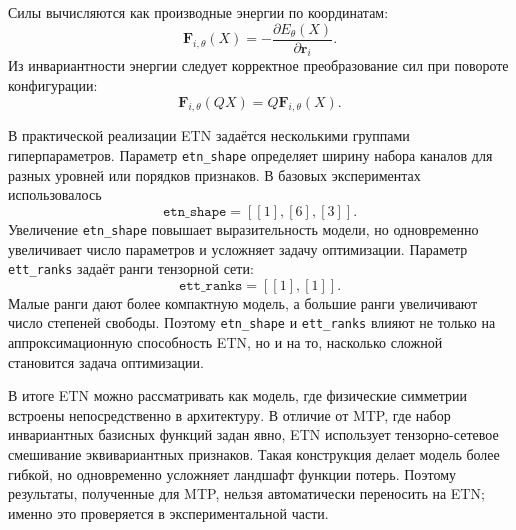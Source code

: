 Силы вычисляются как производные энергии по координатам:
\begin{equation}
    \mathbf F_{i,\theta}(X)
    =
    -
    \frac{\partial E_\theta(X)}
    {\partial \mathbf r_i}.
\end{equation}
Из инвариантности энергии следует корректное преобразование сил при повороте конфигурации:
\begin{equation}
    \mathbf F_{i,\theta}(QX)
    =
    Q\mathbf F_{i,\theta}(X).
\end{equation}

В практической реализации ETN задаётся несколькими группами гиперпараметров. Параметр \texttt{etn\_shape} определяет ширину набора каналов для разных уровней или порядков признаков. В базовых экспериментах использовалось
\begin{equation}
    \texttt{etn\_shape}
    =
    [[1],[6],[3]].
\end{equation}
Увеличение \texttt{etn\_shape} повышает выразительность модели, но одновременно увеличивает число параметров и усложняет задачу оптимизации. Параметр \texttt{ett\_ranks} задаёт ранги тензорной сети:
\begin{equation}
    \texttt{ett\_ranks}
    =
    [[1],[1]].
\end{equation}
Малые ранги дают более компактную модель, а большие ранги увеличивают число степеней свободы. Поэтому \texttt{etn\_shape} и \texttt{ett\_ranks} влияют не только на аппроксимационную способность ETN, но и на то, насколько сложной становится задача оптимизации.

В итоге ETN можно рассматривать как модель, где физические симметрии встроены непосредственно в архитектуру. В отличие от MTP, где набор инвариантных базисных функций задан явно, ETN использует тензорно-сетевое смешивание эквивариантных признаков. Такая конструкция делает модель более гибкой, но одновременно усложняет ландшафт функции потерь. Поэтому результаты, полученные для MTP, нельзя автоматически переносить на ETN; именно это проверяется в экспериментальной части.
